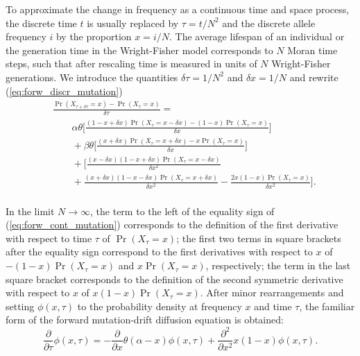 \documentclass[preprint]{elsarticle}
\newcommand\x[1]{\ensuremath{X_{#1}}}
\begin{document}
To approximate the change in frequency as a continuous time and space process, the discrete time $t$ is usually replaced by $\tau = t/N^2$ and the discrete allele frequency $i$ by the proportion $x=i/N$. The average lifespan of an individual or the generation time in the Wright-Fisher model corresponds to $N$ Moran time steps, such that after rescaling time is measured in units of $N$ Wright-Fisher generations. We introduce the quantities $\delta \tau=1/N^2$ and $\delta x=1/N$ and rewrite (\ref{eq:forw_discr_mutation})
\begin{equation}\label{eq:forw_cont_mutation}
\begin{split}
&\frac{\Pr(\x{\tau+\delta \tau}=x)-\Pr(\x{\tau}=x)}{\delta \tau} =\\ &\qquad\alpha\theta \bigg[\frac{(1-x+\delta x)\Pr(\x{\tau}=x-\delta x) - (1-x)\Pr(\x{\tau}=x)}{\delta x}\bigg]\\
&\qquad+\beta\theta \bigg[\frac{(x+\delta x)\Pr(\x{\tau}=x+\delta x) - x\Pr(\x{\tau}=x)}{\delta x}\bigg]\\
&\qquad+\bigg[\frac{(x-\delta x)(1-x+\delta x)\Pr(\x{\tau}=x-\delta x)}{\delta x^2}\\
&\qquad+ \frac{(x+\delta x)(1-x-\delta x)\Pr(\x{\tau}=x+\delta x)}{\delta x^2}-\frac{2x(1-x)\Pr(\x{\tau}=x)}{\delta x^2}\bigg].\\
\end{split}
\end{equation}

In the limit $N \to \infty$, the term to the left of the equality sign of (\ref{eq:forw_cont_mutation}) corresponds to the definition of the first derivative with respect to time $\tau$ of $\Pr(\x{\tau}=x)$; the first two terms in square brackets after the equality sign correspond to the first derivatives with respect to $x$ of $-(1-x)\Pr(\x{\tau}=x)$ and $x\Pr(\x{\tau}=x)$, respectively; the term in the last square bracket corresponds to the definition of the second symmetric derivative with respect to $x$ of $x(1-x)\Pr(\x{\tau}=x)$.  After minor rearrangements and setting $\phi(x,\tau)$ to the probability density at frequency $x$ and time $\tau$, the familiar form of the forward mutation-drift diffusion equation is obtained:
\begin{equation}\label{eq:forw_mutdrift}
\frac{\partial}{\partial \tau} \phi(x,\tau) = -\frac{\partial}{\partial x}\theta(\alpha-x)\phi(x,\tau) +\frac{\partial^2}{\partial x^2}x(1-x)\phi(x,\tau).
\end{equation}
\end{document}
